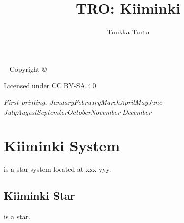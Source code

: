 \documentclass{tufte-book}
\title{TRO: Kiiminki}
\author{Tuukka Turto}
\newcommand{\monthyear}{%
  \ifcase\month\or January\or February\or March\or April\or May\or June\or
  July\or August\or September\or October\or November\or
  December\fi\space\number\year
}
\begin{document}
\frontmatter

\maketitle


\newpage
\begin{fullwidth}
~\vfill
\thispagestyle{empty}
\setlength{\parindent}{0pt}
\setlength{\parskip}{\baselineskip}
Copyright \copyright\ \the\year\ \thanklessauthor

\par{}

\par{}

\par Licensed under CC BY-SA 4.0.

\par\textit{First printing, \monthyear}
\end{fullwidth}

\setcounter{tocdepth}{1}
\tableofcontents
\listoffigures
\listoftables

\mainmatter


\chapter{Kiiminki System}
\label{ch:kiiminki-system}

 is a star system located at xxx-yyy.

\section{Kiiminki Star}

 is a star.
\end{document}
